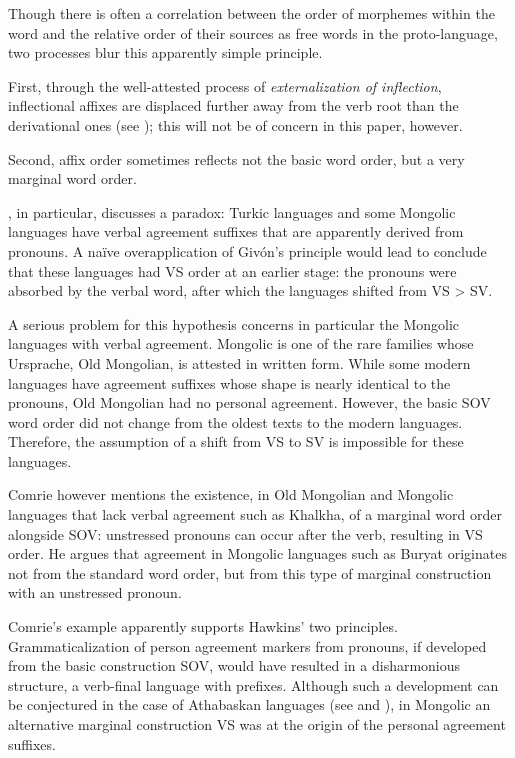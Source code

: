 \documentclass[oldfontcommands,twoside,a4paper,12pt]{article}
\begin{document}
Though there is often a correlation between the order of morphemes within the word and the relative order of their sources as free words in the proto-language, two processes blur this apparently simple principle. 

First, through the well-attested process of \textit{externalization of inflection}, inflectional affixes are displaced further away from the verb root than the derivational ones (see \citealt{haspelmath93extern}); this will not be of concern in this paper, however. 

Second, affix order sometimes reflects not the basic word order, but a very marginal word order. 


\citet[86-90]{comrie80morpho}, in particular, discusses a paradox: Turkic languages and some Mongolic languages have verbal agreement suffixes that are apparently derived from pronouns. A naïve overapplication of Givón's principle would lead to conclude that these languages had VS order at an earlier stage: the pronouns were absorbed by the verbal word, after which the languages shifted from VS > SV.

A serious problem for this hypothesis concerns in particular the Mongolic languages with verbal agreement. Mongolic is one of the rare families whose Ursprache, Old Mongolian, is attested in written form. While some modern languages have agreement suffixes whose shape is nearly identical to the pronouns, Old Mongolian had no personal agreement. However, the basic SOV word order did not change from the oldest texts to the modern languages. Therefore, the assumption of a shift from VS to SV is impossible for these languages.

Comrie however mentions the existence, in Old Mongolian and Mongolic languages that lack verbal agreement such as Khalkha, of a marginal word order alongside SOV: unstressed pronouns can occur after the verb, resulting in VS order. He argues that agreement in Mongolic languages such as Buryat originates not from the standard word order, but from this type of marginal construction with an unstressed pronoun.

Comrie's example apparently supports Hawkins' two principles. Grammaticalization of person agreement  markers from pronouns, if developed from the basic construction SOV, would have resulted in a disharmonious structure, a verb-final language with prefixes. Although such a development can be conjectured in the case of Athabaskan languages (see \citealt{givon2000internal} and \citealt{mithun03prefixes}), in Mongolic an  alternative marginal construction VS was at the origin of the personal agreement suffixes.
\end{document}
